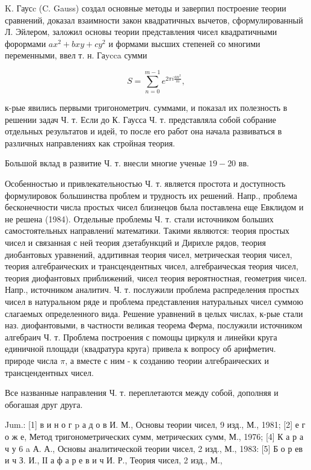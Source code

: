 \documentclass[10pt]{article}
\begin{document}
K. Гаусc (C. Gauss) создал основные методы и заверпил построение теории сравнений, доказал взаимности закон квадратичных вычетов, сформулированный Л. Эйлером, заложил основы теории представления чисел квадратичными форормами $a x^{2}+b x y+c y^{2}$ и формами высших степеней со многими переменными, ввел т. н. Гаycca сумми



\[

S=\sum_{n=0}^{m-1} e^{2 \pi i \frac{a n^{2}}{m}},

\]



к-рые явились первыми тригонометрич. суммами, и показал их полезность в решении задач Ч. т. Если до $К$. Гаусса Ч. т. представляла собой собрание отдельных результатов и идей, то после его работ она начала развиваться в различных направлениях как стройная теория.



Большой вклад в развитие Ч. т. внесли многие ученые $19-20$ вв.



Особенностью и привлекательностью Ч. т. является простота и доступность формулировок большинства проблем и трудность их решений. Напр., проблема бесконечности числа простых чисел близнецов была поставлена еще Евклидом и не решена (1984). Отдельные проблемы Ч. т. стали источником больших самостоятельных направлениї математики. Такими являются: теория простых чисел и связанная с ней теория дзетабункций и Дирихле рядов, теория диобантовых уравнений, аддитивная теория чисел, метрическая теория чисел, теория алгебраических и трансцендентных чисел, алгебраическая теория чисел, теория диофантовых приближений, чисел теория вероятностная, геометрия чисел. Напр., источником аналитич. Ч. т. послужили проблема распределения простых чисел в натуральном ряде и проблема представления натуральных чисел суммою слагаемых определенного вида. Решение уравнений в целых числах, к-рые стали наз. диофантовыми, в частности великая теорема Ферма, послужили источником алгебраич Ч. т. Проблема построения с помощы циркуля и линейки круга единичной площади (квадратура круга) привела к вопросу об арифметич. природе числа $\pi$, а вместе с ним - к созданию теории алгебраических и трансцендентных чисел.



Все названные направления Ч. т. переплетаются между собой, дополняя и обогашая друг друга.



Jum.: [1] в и н о г p а д о в И. М., Основы теории чисел, 9 изд., М., 1981; [2] е г о ж е, Метод тригонометрических сумм, метрических сумм, М., 1976; [4] К а р а ч у 6 a А. А., Основы аналитической теории чисел, 2 изд., М., 1983: [5] Б о р ев и ч З. И., ІІ а ф а р е в и ч И. Р., Теория чисел, 2 изд., М.,
\end{document}
